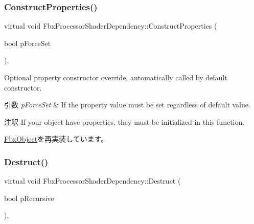 \mbox{\label{class_fbx_processor_shader_dependency_a077ea3e1c83d0a42e597c60153fa5e9a}} 
\subsubsection{\texorpdfstring{Construct\+Properties()}{ConstructProperties()}}
{\footnotesize\ttfamily virtual void Fbx\+Processor\+Shader\+Dependency\+::\+Construct\+Properties (\begin{DoxyParamCaption}\item[{bool}]{p\+Force\+Set }\end{DoxyParamCaption})\hspace{0.3cm}{\ttfamily [protected]}, {\ttfamily [virtual]}}

Optional property constructor override, automatically called by default constructor. 
\begin{DoxyParams}{引数}
{\em p\+Force\+Set} & If the property value must be set regardless of default value. \\
\hline
\end{DoxyParams}
\begin{DoxyRemark}{注釈}
If your object have properties, they must be initialized in this function. 
\end{DoxyRemark}


\hyperlink{class_fbx_object_ad44f814323dc1b5e78bff1bfc608b4bb}{Fbx\+Object}を再実装しています。

\mbox{\label{class_fbx_processor_shader_dependency_aba3453491b05632a4972d32a04e8b283}} 
\subsubsection{\texorpdfstring{Destruct()}{Destruct()}}
{\footnotesize\ttfamily virtual void Fbx\+Processor\+Shader\+Dependency\+::\+Destruct (\begin{DoxyParamCaption}\item[{bool}]{p\+Recursive }\end{DoxyParamCaption})\hspace{0.3cm}{\ttfamily [protected]}, {\ttfamily [virtual]}}

